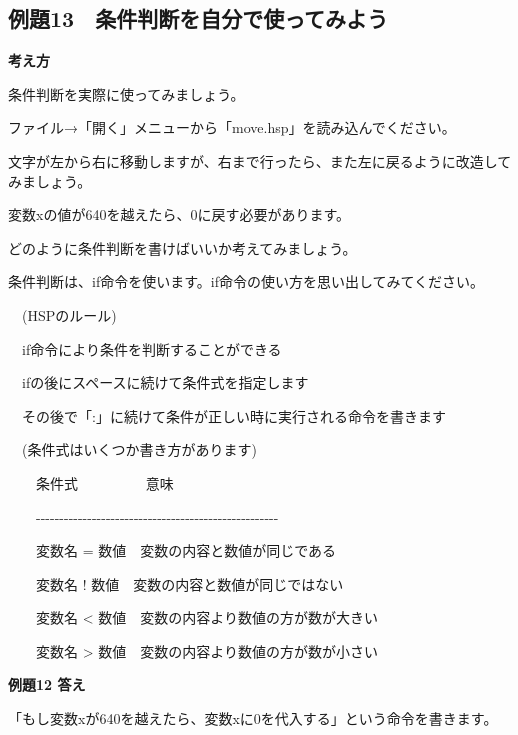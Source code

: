 \documentclass[a4paper,12pt]{jarticle}
\begin{document}
\clearpage
\subsection{例題13　条件判断を自分で使ってみよう}
\bigskip
\bigskip

{\bfseries
考え方}

\bigskip

条件判断を実際に使ってみましょう。

ファイル→「開く」メニューから「move.hsp」を読み込んでください。

文字が左から右に移動しますが、右まで行ったら、また左に戻るように改造してみましょう。

変数xの値が640を越えたら、0に戻す必要があります。

どのように条件判断を書けばいいか考えてみましょう。

\bigskip

条件判断は、if命令を使います。if命令の使い方を思い出してみてください。

\bigskip

\ \ (HSPのルール)

\bigskip

\ \ if命令により条件を判断することができる

\ \ ifの後にスペースに続けて条件式を指定します

\ \ その後で「:」に続けて条件が正しい時に実行される命令を書きます

\bigskip

\ \ (条件式はいくつか書き方があります)

\bigskip

\ \ \ \ 条件式 \ \ \ \ \ \ \ \ \ 意味

\ \ \ \ {}-{}-{}-{}-{}-{}-{}-{}-{}-{}-{}-{}-{}-{}-{}-{}-{}-{}-{}-{}-{}-{}-{}-{}-{}-{}-{}-{}-{}-{}-{}-{}-{}-{}-{}-{}-{}-{}-{}-{}-{}-{}-{}-{}-{}-{}-{}-{}-{}-{}-{}-{}-

\ \ \ \ 変数名 =
数値\ \ 変数の内容と数値が同じである

\ \ \ \ 変数名 !
数値\ \ 変数の内容と数値が同じではない

\ \ \ \ 変数名 {\textless}
数値\ \ 変数の内容より数値の方が数が大きい

\ \ \ \ 変数名 {\textgreater}
数値\ \ 変数の内容より数値の方が数が小さい

\bigskip
\bigskip

{\bfseries
例題12 答え}

\bigskip

「もし変数xが640を越えたら、変数xに0を代入する」という命令を書きます。
\end{document}
